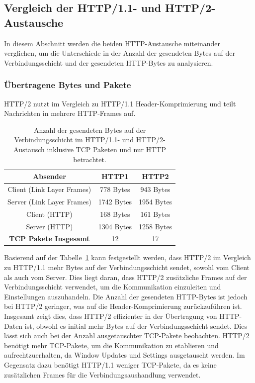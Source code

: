 \FloatBarrier
\subsection{Vergleich der HTTP/1.1- und HTTP/2-Austausche}

In diesem Abschnitt werden die beiden HTTP-Austausche miteinander verglichen, um die Unterschiede in der Anzahl der gesendeten Bytes auf der Verbindungsschicht und der gesendeten HTTP-Bytes zu analysieren.

\subsubsection*{Übertragene Bytes und Pakete}

HTTP/2 nutzt im Vergleich zu HTTP/1.1 Header-Komprimierung und teilt Nachrichten in mehrere HTTP-Frames auf.

\begin{table}[ht]
    \centering
    \begin{tabular}{|c|c|c|}
        \hline
        \textbf{Absender} & \textbf{HTTP1} & \textbf{HTTP2} \\
        \hline
        Client (Link Layer Frames) & 778 Bytes & 943 Bytes \\
        Server (Link Layer Frames) & 1742 Bytes & 1954 Bytes \\
        Client (HTTP) & 168 Bytes & 161 Bytes \\
        Server (HTTP) & 1304 Bytes & 1258 Bytes \\
        \hline
        \textbf{TCP Pakete Insgesamt} & 12 & 17 \\
        \hline
    \end{tabular}
    \caption{Anzahl der gesendeten Bytes auf der Verbindungsschicht im HTTP/1.1- und HTTP/2-Austausch inklusive TCP Paketen und nur HTTP betrachtet.}
    \label{tab:bytes}
\end{table}

Basierend auf der Tabelle~\ref{tab:bytes} kann festgestellt werden, dass HTTP/2 im Vergleich zu HTTP/1.1 mehr Bytes auf der Verbindungsschicht sendet, sowohl vom Client als auch vom Server.
Dies liegt daran, dass HTTP/2 zusätzliche Frames auf der Verbindungsschicht verwendet, um die Kommunikation einzuleiten und Einstellungen auszuhandeln.
Die Anzahl der gesendeten HTTP-Bytes ist jedoch bei HTTP/2 geringer, was auf die Header-Komprimierung zurückzuführen ist.
Insgesamt zeigt dies, dass HTTP/2 effizienter in der Übertragung von HTTP-Daten ist, obwohl es initial mehr Bytes auf der Verbindungsschicht sendet.
Dies lässt sich auch bei der Anzahl ausgetauschter TCP-Pakete beobachten.
HTTP/2 benötigt mehr TCP-Pakete, um die Kommunikation zu etablieren und aufrechtzuerhalten, da Window Updates und Settings ausgetauscht werden.
Im Gegensatz dazu benötigt HTTP/1.1 weniger TCP-Pakete, da es keine zusätzlichen Frames für die Verbindungsaushandlung verwendet.

